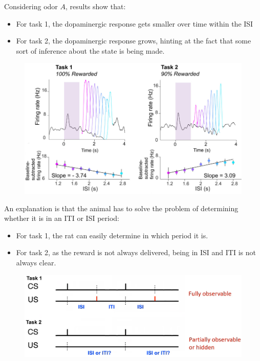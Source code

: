 \begin{casestudy}
    Considering odor $A$, results show that:
    \begin{itemize}
        \item For task 1, the dopaminergic response gets smaller over time within the ISI
        \item For task 2, the dopaminergic response grows, hinting at the fact that some sort of inference about the state is being made.
    \end{itemize} 
    \begin{figure}[H]
        \centering
        \includegraphics[width=0.65\linewidth]{./img/dopamine_hidden3.png}
    \end{figure}

    An explanation is that the animal has to solve the problem of determining whether it is in an ITI or ISI period:
    \begin{itemize}
        \item For task 1, the rat can easily determine in which period it is.
        \item For task 2, as the reward is not always delivered, being in ISI and ITI is not always clear.
    \end{itemize}
    \begin{figure}[H]
        \centering
        \includegraphics[width=0.5\linewidth]{./img/dopamine_hidden4.png}
    \end{figure}


\end{casestudy}
